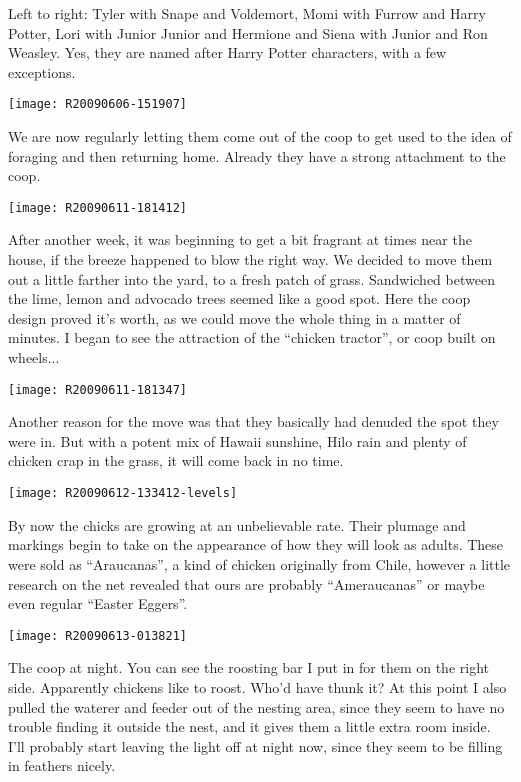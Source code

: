 Left to right: Tyler with Snape and Voldemort, Momi with Furrow and
Harry Potter, Lori with Junior Junior and Hermione and Siena with Junior
and Ron Weasley.  Yes, they are named after Harry Potter characters,
with a few exceptions. 
\newpage

\texttt{[image: R20090606-151907]}

We are now regularly letting them come out of the coop to get used to
the idea of foraging and then returning home.  Already they have a
strong attachment to the coop. 
\newpage

\texttt{[image: R20090611-181412]}

After another week, it was beginning to get a bit fragrant at times near
the house, if the breeze happened to blow the right way.  We decided to
move them out a little farther into the yard, to a fresh patch of grass.
Sandwiched between the lime, lemon and advocado trees seemed like a good
spot.  Here the coop design proved it's worth, as we could move the
whole thing in a matter of minutes.  I began to see the attraction of
the ``chicken tractor'', or coop built on wheels... 
\newpage

\texttt{[image: R20090611-181347]}

Another reason for the move was that they basically had denuded the spot
they were in.  But with a potent mix of Hawaii sunshine, Hilo rain and
plenty of chicken crap in the grass, it will come back in no time. 
\newpage

\texttt{[image: R20090612-133412-levels]}

By now the chicks are growing at an unbelievable rate.  Their plumage
and markings begin to take on the appearance of how they will look as
adults.  These were sold as ``Araucanas'', a kind of chicken originally
from Chile, however a little research on the net revealed that ours are
probably ``Ameraucanas'' or maybe even regular ``Easter Eggers''.  
\newpage

\texttt{[image: R20090613-013821]}

The coop at night.  You can see the roosting bar I put in for them on
the right side.  Apparently chickens like to roost.  Who'd have thunk
it?  At this point I also pulled the waterer and feeder out of the
nesting area, since they seem to have no trouble finding it outside the
nest, and it gives them a little extra room inside.  I'll probably start
leaving the light off at night now, since they seem to be filling in
feathers nicely. 
\newpage

